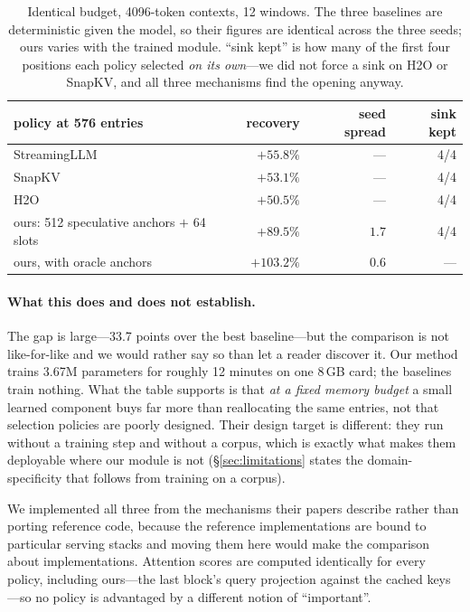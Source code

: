 \documentclass[11pt]{article}
\begin{document}
\begin{table}[ht]
\centering
\small
\begin{tabular}{lrrr}
\toprule
policy at 576 entries & recovery & seed spread & sink kept \\
\midrule
StreamingLLM \citep{streamingllm} & $+55.8\%$ & --- & 4/4 \\
SnapKV \citep{snapkv}             & $+53.1\%$ & --- & 4/4 \\
H2O \citep{h2o}                   & $+50.5\%$ & --- & 4/4 \\
\midrule
ours: 512 speculative anchors $+$ 64 slots & $\mathbf{+89.5\%}$ & $1.7$ & 4/4 \\
ours, with oracle anchors                  & $+103.2\%$ & $0.6$ & --- \\
\bottomrule
\end{tabular}
\caption{Identical budget, 4096-token contexts, 12 windows. The three baselines
are deterministic given the model, so their figures are identical across the
three seeds; ours varies with the trained module. ``sink kept'' is how many of
the first four positions each policy selected \emph{on its own}---we did not
force a sink on H2O or SnapKV, and all three mechanisms find the opening
anyway.}
\label{tab:baselines}
\end{table}

\paragraph{What this does and does not establish.}
The gap is large---33.7 points over the best baseline---but the comparison is
not like-for-like and we would rather say so than let a reader discover it. Our
method trains 3.67M parameters for roughly 12 minutes on one 8\,GB card; the
baselines train nothing. What the table supports is that \emph{at a fixed memory
budget} a small learned component buys far more than reallocating the same
entries, not that selection policies are poorly designed. Their design target is
different: they run without a training step and without a corpus, which is
exactly what makes them deployable where our module is not
(\S\ref{sec:limitations} states the domain-specificity that follows from
training on a corpus).

We implemented all three from the mechanisms their papers describe rather than
porting reference code, because the reference implementations are bound to
particular serving stacks and moving them here would make the comparison about
implementations. Attention scores are computed identically for every policy,
including ours---the last block's query projection against the cached keys---so
no policy is advantaged by a different notion of ``important''.
\end{document}
